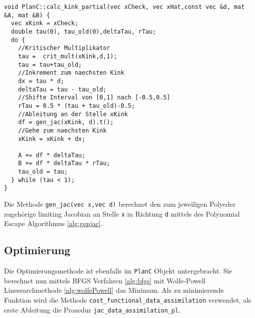 \begin{lstlisting}[caption=Berechnung der gewichteten Ableitung, label=lst:kinkPartials]
void PlanC::calc_kink_partial(vec xCheck, vec xHat,const vec &d, mat &A, mat &B) {
  vec xKink = xCheck;
  double tau(0), tau_old(0),deltaTau, rTau;
  do {
    //Kritischer Multiplikator
    tau =  crit_mult(xKink,d,1);
    tau = tau+tau_old;
    //Inkrement zum naechsten Kink
    dx = tau * d;
    deltaTau = tau - tau_old;
    //Shifte Interval von [0,1] nach [-0.5,0.5]
    rTau = 0.5 * (tau + tau_old)-0.5;
    //Ableitung an der Stelle xKink
    df = gen_jac(xKink, d).t();
    //Gehe zum naechsten Kink
    xKink = xKink + dx;

    A += df * deltaTau;
    B += df * deltaTau * rTau;
    tau_old = tau;
  } while (tau < 1);
}
\end{lstlisting}

Die Methode \texttt{gen\_jac(vec x,vec d)} berechnet den zum jeweiligen Polyeder zugehörige limiting Jacobian an Stelle \texttt{x} in Richtung \texttt{d} mittels des Polynomial Escape Algorithmus \ref{alg:genjac}. 


\subsection{Optimierung}
Die Optimierungsmethode ist ebenfalls im \texttt{PlanC} Objekt untergebracht. Sie berechnet nun mittels BFGS Verfahren \ref{alg:bfgs} mit Wolfe-Powell Linesearchmethode \ref{alg:wolfePowell} das Minimum. 
Als zu minimierende Funktion wird die Methode \texttt{cost\_functional\_data\_assimilation} verwendet, als erste Ableitung die Prozedur \texttt{jac\_data\_assimilation\_pl}. 

% 

